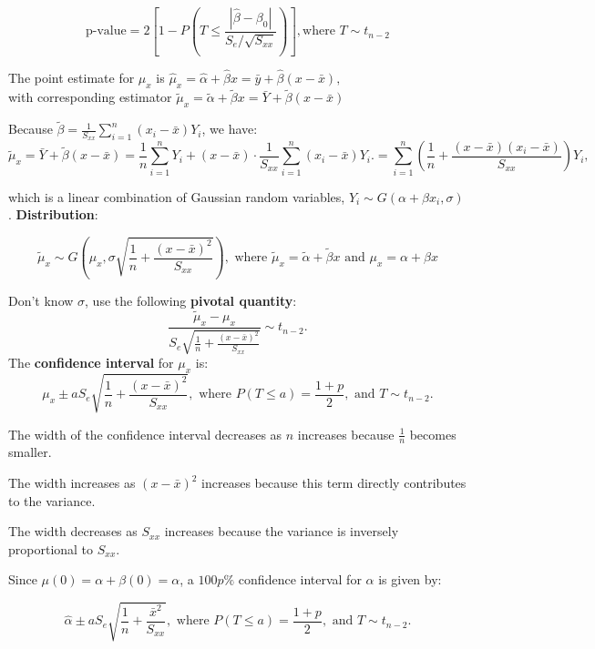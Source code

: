 \documentclass[a4paper,12pt]{article}
\begin{document}
\[
\text{p-value} = 2 \left[ 1 - P\left( T \leq \frac{|\hat{\beta} - \beta_0|}{S_e / \sqrt{S_{xx}}} \right) \right],
\text{where } T \sim t_{n-2} \]
\bigskip

The point estimate for \(\mu_x\) is
$\hat{\mu}_x = \hat{\alpha} + \hat{\beta}x = \bar{y} + \hat{\beta}(x - \bar{x}),$
\\with corresponding estimator
$ \tilde{\mu}_x = \tilde{\alpha} + \tilde{\beta}x = \bar{Y} + \tilde{\beta}(x - \bar{x})$
\bigskip

Because \(\tilde{\beta} = \frac{1}{S_{xx}} \sum_{i=1}^n (x_i - \bar{x}) Y_i\), we have:
\[
\tilde{\mu}_x = \bar{Y} + \tilde{\beta}(x - \bar{x})
= \frac{1}{n} \sum_{i=1}^n Y_i + (x - \bar{x}) \cdot \frac{1}{S_{xx}} \sum_{i=1}^n (x_i - \bar{x}) Y_i.
= \sum_{i=1}^n \left( \frac{1}{n} + \frac{(x - \bar{x})(x_i - \bar{x})}{S_{xx}} \right) Y_i,
\]

which is a linear combination of Gaussian random variables, \( Y_i \sim G(\alpha + \beta x_i, \sigma) \). \textbf{Distribution}:

\[
\tilde{\mu}_x \sim G\left(\mu_x, \sigma \sqrt{\frac{1}{n} + \frac{(x - \bar{x})^2}{S_{xx}}} \right),
\text{ where } \tilde{\mu}_x = \tilde{\alpha} + \tilde{\beta}x \text{ and } \mu_x = \alpha + \beta x\]

Don’t know \(\sigma\), use the following \textbf{pivotal quantity}:
\[
\frac{\tilde{\mu}_x - \mu_x}{S_e \sqrt{\frac{1}{n} + \frac{(x - \bar{x})^2}{S_{xx}}}} \sim t_{n-2}.
\]
The \textbf{confidence interval} for \(\mu_x\) is:
\[
\mu_x \pm a S_e \sqrt{\frac{1}{n} + \frac{(x - \bar{x})^2}{S_{xx}}},
 \text{ where } P(T \leq a) = \frac{1 + p}{2}, \text{ and } T \sim t_{n-2}.\]

  The width of the confidence interval decreases as \(n\) increases because  \(\frac{1}{n}\) becomes smaller.  

  The width increases as \((x - \bar{x})^2\) increases because this term directly contributes to the variance.  

  The width decreases as \(S_{xx}\) increases because the variance is inversely proportional to \(S_{xx}\).
\bigskip

Since \(\mu(0) = \alpha + \beta(0) = \alpha\), a \(100p\%\) confidence interval for \(\alpha\) is given by:

\[
\hat{\alpha} \pm a S_e \sqrt{\frac{1}{n} + \frac{\bar{x}^2}{S_{xx}}},
 \text{ where } P(T \leq a) = \frac{1 + p}{2}, \text{ and } T \sim t_{n-2}.\]
\end{document}
